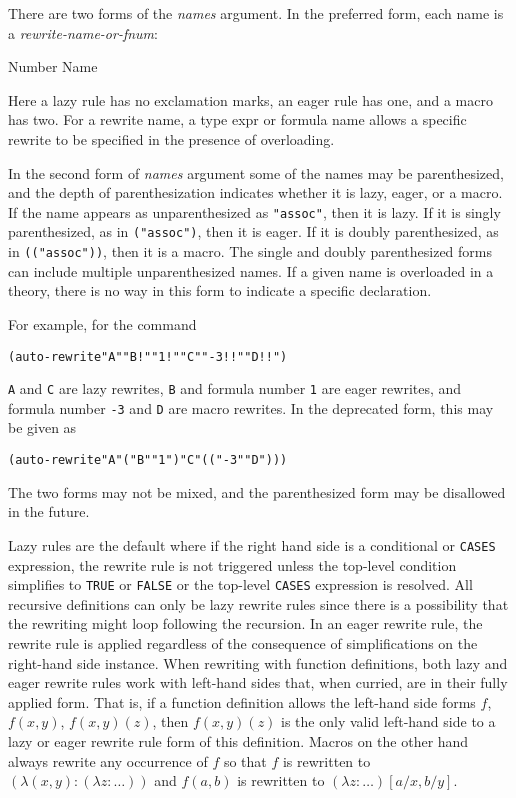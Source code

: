 \documentclass[12pt]{book}
\begin{document}
\begin{description}
There are two forms of the \emph{names} argument.  In the preferred form,
each name is a \emph{rewrite-name-or-fnum}:

\begin{bnf}
  {\opt{\lit{-}} Number \opt{\lit{!} \opt{\lit{!}}}}
  {Name \opt{\lit{!} \opt{\lit{!}}} }
\end{bnf}

Here a lazy rule has no exclamation marks, an eager rule has one, and a
macro has two.  For a rewrite name, a type expr or formula name allows a
specific rewrite to be specified in the presence of overloading.

In the second form of \emph{names} argument some of the names may be
parenthesized, and the depth of parenthesization indicates whether it is
lazy, eager, or a macro.  If the name appears as unparenthesized as
\texttt{"assoc"}, then it is lazy.  If it is singly parenthesized, as in
\texttt{("assoc")}, then it is eager.  If it is doubly parenthesized, as
in \texttt{(("assoc"))}, then it is a macro.  The single and doubly
parenthesized forms can include multiple unparenthesized names.  If a
given name is overloaded in a theory, there is no way in this form to
indicate a specific declaration.

For example, for the command
\begin{alltt}
  (auto-rewrite "A" "B!" "1!" "C" "-3!!" "D!!")
\end{alltt}
\texttt{A} and \texttt{C} are lazy rewrites, \texttt{B} and formula number
\texttt{1} are eager rewrites, and formula number \texttt{-3} and
\texttt{D} are macro rewrites.  In the deprecated form, this may be given
as
\begin{alltt}
  (auto-rewrite "A" ("B" "1") "C" (("-3" "D")))
\end{alltt}
The two forms may not be mixed, and the parenthesized form may be
disallowed in the future.

Lazy rules are the default where if the right hand side is a conditional
or \texttt{CASES} expression, the rewrite rule is not triggered unless the 
top-level condition simplifies to \texttt{TRUE} or \texttt{FALSE} or the
top-level \texttt{CASES} expression is resolved.  All recursive definitions
can only be lazy rewrite rules since there is a possibility that the
rewriting might loop following the recursion.  In an eager rewrite rule,
the rewrite rule is applied regardless of the consequence of
simplifications on the right-hand side instance.  When rewriting with
function definitions, both lazy and eager rewrite rules work with
left-hand sides that, when curried, are in their fully applied form.  That
is, if a function definition allows the left-hand side forms $f$, $f(x,
y)$, $f(x, y)(z)$, then $f(x, y)(z)$ is the only valid left-hand side to a
lazy or eager rewrite rule form of this definition.  Macros on the other
hand always rewrite any occurrence of $f$ so that $f$ is rewritten to
$(\lambda (x, y): (\lambda z: \ldots))$ and $f(a, b)$ is rewritten to
$(\lambda z: \ldots)[a/x, b/y]$\@.



\end{description}
\end{document}
